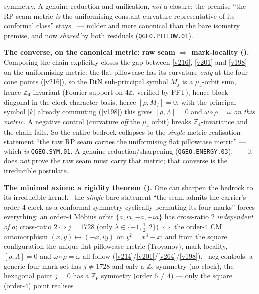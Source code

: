 \documentclass[11pt,a4paper]{article}
\newcommand{\Z}{\mathbb Z}
\begin{document}
\begin{keybox}
symmetry. A genuine reduction and unification, \emph{not} a closure: the premise ``the RP seam metric
\emph{is} the uniformising constant-curvature representative of its conformal class'' stays \mO\ ---
milder and more canonical than the bare isometry premise, and now \emph{shared} by both residuals
(\texttt{QGEO.PILLOW.01}).
\par\smallskip\noindent\textbf{The converse, on the canonical metric: raw seam $\Rightarrow$ mark-locality
().} Composing the chain explicitly closes the gap between
\vref{v216}, \vref{v201} and \vref{v198} on the uniformising metric: the flat pillowcase has its curvature
\emph{only} at the four cone points (\vref{v216}), so the DtN sub-principal symbol $M_f$ is a $\mu_4$-orbit
sum, hence $\Z_4$-invariant (Fourier support on $4\Z$, verified by FFT), hence block-diagonal in the
clock-character basis, hence $[\rho,M_f]=0$; with the principal symbol $|k|$ already commuting (\vref{v198})
this gives $[\rho,\Lambda]=0$ and $\omega\circ\rho=\omega$ \emph{on this metric}. A negative control (curvature
\emph{off} the $\mu_4$ orbit) breaks $\Z_4$-invariance and the chain fails. So the entire bedrock collapses
to the \emph{single} metric-realisation statement ``the raw RP seam carries the uniformising flat pillowcase
metric'' --- which \emph{is} \texttt{QGEO.SYM.01}. A genuine reduction/sharpening (\texttt{QGEO.ENERGY.03}),
\mO\ --- it does \emph{not} prove the raw seam must carry that metric; that converse is the irreducible
postulate.
\par\smallskip\noindent\textbf{The minimal axiom: a rigidity theorem ().}
One can sharpen the bedrock to its irreducible kernel. \mE\ the \emph{single} bare statement ``the seam admits
the carrier's order-$4$ clock as a conformal symmetry cyclically permuting its four marks'' forces everything:
an order-$4$ M\"obius orbit $\{a,ia,-a,-ia\}$ has cross-ratio $2$ \emph{independent of} $a$; cross-ratio $2
\Leftrightarrow j{=}1728$ (only $\lambda\in\{-1,\tfrac12,2\}$) $\Leftrightarrow$ the order-$4$ CM automorphism
$(x,y)\mapsto(-x,iy)$ on $y^2{=}x^3{-}x$; and from the square configuration the unique flat pillowcase metric
(Troyanov), mark-locality, $[\rho,\Lambda]{=}0$ and $\omega\circ\rho{=}\omega$ all follow (\vref{v214}/\vref{v201}/\vref{v264}/\vref{v198}).
\mE\ neg controls: a generic four-mark set has $j\neq1728$ and only a $\Z_2$ symmetry (no clock), the
hexagonal point $j{=}0$ has a $\Z_6$ symmetry (order $6\neq4$) --- only the square (order-$4$) point realises

\end{keybox}
\end{document}
